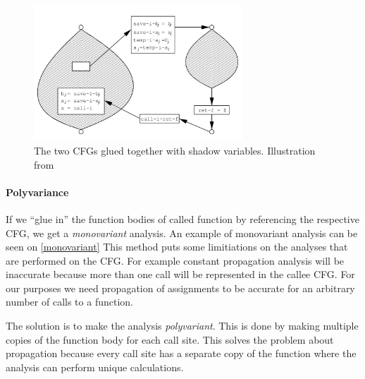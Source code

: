 \begin{figure}[H]
  \center
  \includegraphics[width=0.7\textwidth]{figures/interprocedural_glue}
  \caption{The two CFGs glued together with shadow variables. Illustration from \citet[p.~38]{schwartzbach}}
  \label{interprocedural_glue}
\end{figure}

\paragraph{Polyvariance}
If we ``glue in'' the function bodies of called function by referencing the respective CFG, we get a \emph{monovariant} analysis.
An example of monovariant analysis can be seen on \cref{monovariant}
This method puts some limitiations on the analyses that are performed on the CFG.
For example constant propagation analysis will be inaccurate because more than one call will be represented in the callee CFG.
For our purposes we need propagation of assignments to be accurate for an arbitrary number of calls to a function.

The solution is to make the analysis \emph{polyvariant}.
This is done by making multiple copies of the function body for each call site.
This solves the problem about propagation because every call site has a separate copy of the function where the analysis can perform unique calculations.

